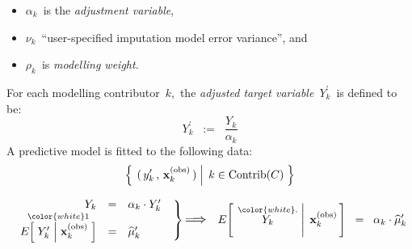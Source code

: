 \begin{itemize}
\begin{itemize}
    \item
        $\alpha_{k}$\, is the \textit{adjustment variable},
    \item
        $\nu_{k}$\, ``user-specified imputation model error variance'', and
    \item
        $\rho_{k}$\, is \textit{modelling weight}.
    \end{itemize}
    For each modelling contributor \,$k$,\, the \textit{adjusted target variable}
    \,$Y^{\prime}_{k}$\,
    is defined to be:
    \begin{equation*}
    Y^{\prime}_{k}
    \;\; := \;\;
        \dfrac{Y_{k}}{\alpha_{k}}
    \end{equation*}
    A predictive model is fitted to the following data:
    \begin{equation*}
    \left\{\;
        \left.
        (\,y^{\prime}_{k}\,,\,\mathbf{x}^{\textnormal{(obs)}}_{k}\,)
        \;\right\vert\;
        k \in \textnormal{Contrib}(C)
        \;\right\}
    \end{equation*}
\end{itemize}


\begin{equation*}
\left.\begin{array}{rcl}
Y_{k}
& = &
    \alpha_{k} \cdot Y^{\prime}_{k}
\\
\overset{{\color{white}1}}{E\!\left[\;
    Y^{\prime}_{k}
    \,\left\vert\;
    \mathbf{x}^{\textnormal{(obs)}}_{k}
    \right.
    \,\right]}
& = &
        \widehat{\mu}^{\prime}_{k}
\end{array}
\;\;\right\}
\textnormal{\large$\Longrightarrow$}\quad
E\!\left[\;
    \left.
    \overset{{\color{white}.}}{Y_{k}}
    \;\right\vert\;
    \mathbf{x}^{\textnormal{(obs)}}_{k}
    \,\right]
\;\; = \;\;
    \alpha_{k} \cdot \widehat{\mu}^{\prime}_{k}
\end{equation*}


